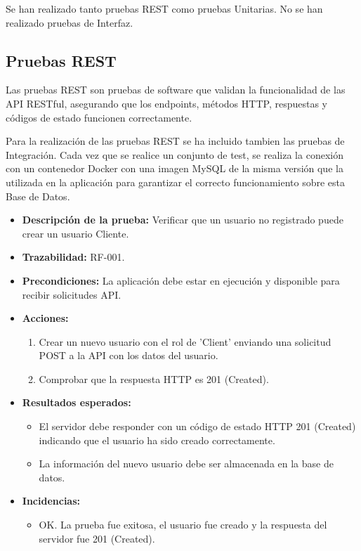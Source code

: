 Se han realizado tanto pruebas REST como pruebas Unitarias. No se han realizado pruebas de Interfaz.

\subsection{Pruebas REST}
Las pruebas REST son pruebas de software que validan la funcionalidad de las API RESTful, asegurando que los endpoints, métodos HTTP, respuestas y códigos de 
estado funcionen correctamente.

Para la realización de las pruebas REST se ha incluido tambien las pruebas de Integración. Cada vez que se realice un conjunto de test, se realiza la conexión con 
un contenedor Docker con una imagen MySQL de la misma versión que la utilizada en la aplicación para garantizar el correcto funcionamiento sobre esta Base de Datos.


\begin{itemize}
    \item \textbf{Descripción de la prueba:} Verificar que un usuario no registrado puede crear un usuario Cliente.
    \item \textbf{Trazabilidad:} RF-001.
    \item \textbf{Precondiciones:} La aplicación debe estar en ejecución y disponible para recibir solicitudes API.
    \item \textbf{Acciones:}
    \begin{enumerate} 
        \item Crear un nuevo usuario con el rol de 'Client' enviando una solicitud POST a la API con los datos del usuario.
        \item Comprobar que la respuesta HTTP es 201 (Created).
    \end{enumerate}
    \item \textbf{Resultados esperados:}
    \begin{itemize}
        \item El servidor debe responder con un código de estado HTTP 201 (Created) indicando que el usuario ha sido creado correctamente.
        \item La información del nuevo usuario debe ser almacenada en la base de datos.
    \end{itemize}
    \item \textbf{Incidencias:}
    \begin{itemize}
        \item OK. La prueba fue exitosa, el usuario fue creado y la respuesta del servidor fue 201 (Created).
    \end{itemize}
\end{itemize}

